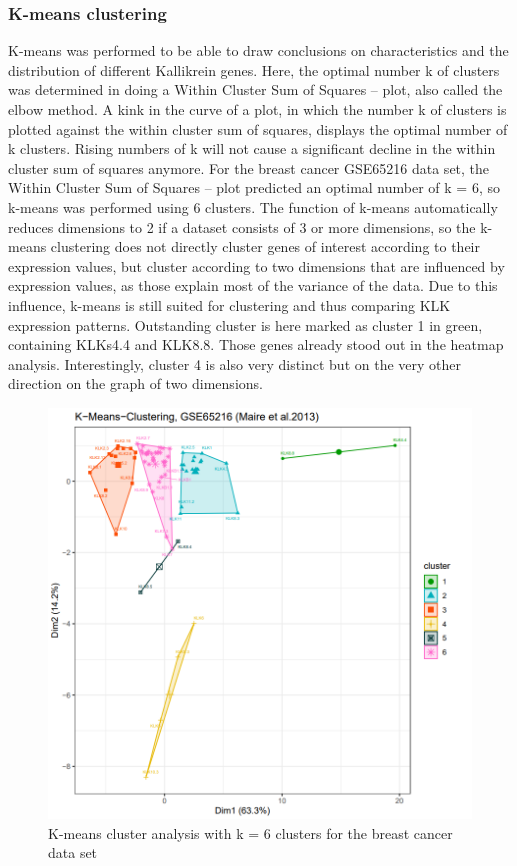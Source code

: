 \documentclass[
]{article}
\begin{document}
\hypertarget{k-means-clustering}{%
\subsubsection{K-means clustering}\label{k-means-clustering}}

K-means was performed to be able to draw conclusions on characteristics
and the distribution of different Kallikrein genes. Here, the optimal
number k of clusters was determined in doing a Within Cluster Sum of
Squares -- plot, also called the elbow method. A kink in the curve of a
plot, in which the number k of clusters is plotted against the within
cluster sum of squares, displays the optimal number of k clusters.
Rising numbers of k will not cause a significant decline in the within
cluster sum of squares anymore. For the breast cancer GSE65216 data set,
the Within Cluster Sum of Squares -- plot predicted an optimal number of
k = 6, so k-means was performed using 6 clusters. The function of
k-means automatically reduces dimensions to 2 if a dataset consists of 3
or more dimensions, so the k-means clustering does not directly cluster
genes of interest according to their expression values, but cluster
according to two dimensions that are influenced by expression values, as
those explain most of the variance of the data. Due to this influence,
k-means is still suited for clustering and thus comparing KLK expression
patterns. Outstanding cluster is here marked as cluster 1 in green,
containing KLKs4.4 and KLK8.8. Those genes already stood out in the
heatmap analysis. Interestingly, cluster 4 is also very distinct but on
the very other direction on the graph of two dimensions.

\begin{figure}

{\centering \includegraphics[width=0.5\linewidth]{images/kmeans_6_breast} 

}

\caption{K-means cluster analysis with k = 6 clusters for the breast cancer data set}\label{fig:K-means plot - breast }
\end{figure}
\end{document}
